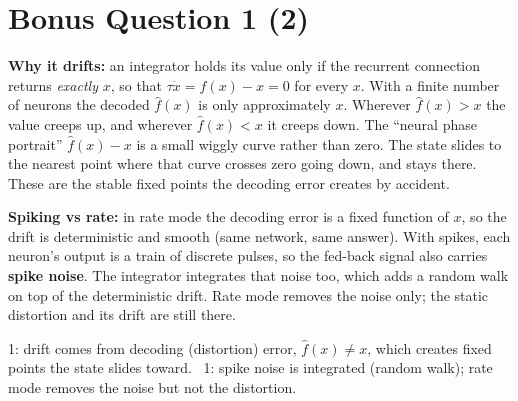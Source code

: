 \documentclass[11pt,letterpaper]{article}
\begin{document}
\section*{Bonus Question 1 \hfill (2)}
\textbf{Why it drifts:} an integrator holds its value only if the recurrent connection returns \emph{exactly} $x$, so that $\tau\dot x = f(x) - x = 0$ for every $x$. With a finite number of neurons the decoded $\hat f(x)$ is only approximately $x$. Wherever $\hat f(x) > x$ the value creeps up, and wherever $\hat f(x) < x$ it creeps down. The ``neural phase portrait'' $\hat f(x) - x$ is a small wiggly curve rather than zero. The state slides to the nearest point where that curve crosses zero going down, and stays there. These are the stable fixed points the decoding error creates by accident.

\textbf{Spiking vs rate:} in rate mode the decoding error is a fixed function of $x$, so the drift is deterministic and smooth (same network, same answer). With spikes, each neuron's output is a train of discrete pulses, so the fed-back signal also carries \textbf{spike noise}. The integrator integrates that noise too, which adds a random walk on top of the deterministic drift. Rate mode removes the noise only; the static distortion and its drift are still there.
\begin{marking}
1: drift comes from decoding (distortion) error, $\hat f(x) \neq x$, which creates fixed points the state slides toward. \ 1: spike noise is integrated (random walk); rate mode removes the noise but not the distortion.
\end{marking}
\end{document}
